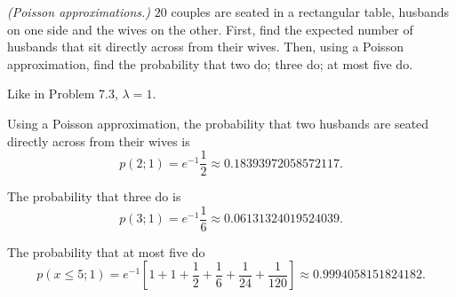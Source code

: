 \begin{problem}[Handout 10, \# 17 (a)]
  \emph{(Poisson approximations.)} \(20\) couples are seated in a
  rectangular table, husbands on one side and the wives on the
  other. First, find the expected number of husbands that sit directly
  across from their wives. Then, using a Poisson approximation, find the
  probability that two do; three do; at most five do.
\end{problem}
\begin{solution}
  Like in Problem 7.3, \(\lambda=1\).

  Using a Poisson approximation, the probability that two husbands are
  seated directly across from their wives is
  \[
    p(2;1)=e^{-1}\frac{1}{2}\approx\num{0.18393972058572117}.
  \]

  The probability that three do is
  \[
    p(3;1)=e^{-1}\frac{1}{6}\approx\num{0.06131324019524039}.
  \]

  The probability that at most five do
  \[
    p(x\leq 5;1)=%
    e^{-1}%
    \left[1+1+\frac{1}{2}+\frac{1}{6}+\frac{1}{24}+\frac{1}{120}\right]\approx%
    \num{0.9994058151824182}.
  \]
\end{solution}

